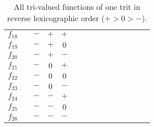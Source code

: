 \begin{table}
{\begin{tabular}{ccccccccccccccc}
    $f_{  18}      $ &  &  $-$  &  $+$  &  $+$      \\
    $f_{  19}      $ &  &  $-$  &  $+$  &  $0$      \\
    $f_{  20}      $ &  &  $-$  &  $+$  &  $-$      \\
    $f_{  21}      $ &  &  $-$  &  $0$  &  $+$      \\
    $f_{  22}      $ &  &  $-$  &  $0$  &  $0$      \\
    $f_{  23}      $ &  &  $-$  &  $0$  &  $-$      \\
    $f_{  24}      $ &  &  $-$  &  $-$  &  $+$      \\
    $f_{  25}      $ &  &  $-$  &  $-$  &  $0$      \\
    $f_{  26}      $ &  &  $-$  &  $-$  &  $-$      \\
\hline
\end{tabular}
}
\caption{All tri-valued functions of one trit in reverse lexicographic order
($+ > 0 > -$).
\label{2005-ko-t31tri} }
\end{table}


%
%
%
%
%
%


